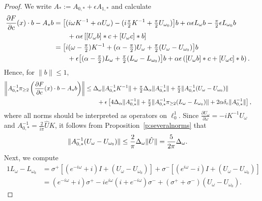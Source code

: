 \begin{proof}
We write $A_* := A_{0,*} + \epsilon A_{1,*}$ and calculate
\begin{alignat*}{1}
\frac{\partial F}{\partial c} (x) \cdot b - A_* b 
& = 
 \bigl[( i \omega K^{-1} + \alpha U_{\omega}) - ( i \tfrac{\pi}{2} K^{-1} + \tfrac{\pi}{2} U_{\omega_0}) \bigr] b  + \alpha \epsilon  L_\omega b  - \tfrac{\pi}{2} \epsilon L_{\omega_0} b 
 \\& \qquad
	+ \alpha \epsilon \left[ [ U_\omega b] * c + [U_{\omega} c ]*b \right]
 \\ & =
	\bigl[ i ( \omega - \tfrac{\pi}{2} ) K^{-1} + ( \alpha - \tfrac{\pi}{2}) U_{\omega} + \tfrac{\pi}{2} ( U_{\omega} - U_{\omega_0}) \bigr] b 
	\\ & \qquad 
	+ \epsilon \bigl[ ( \alpha - \tfrac{\pi}{2}) L_{\omega} + \tfrac{\pi}{2} ( L_{\omega} - L_{\omega_0}) \bigr] b 
+ \alpha \epsilon \left( [U_{\omega } b] * c + [ U_{\omega } c ]*b \right) . 
\end{alignat*}
Hence, for $\|b\| \leq 1$, 
\begin{alignat}{1}
	\left\| A_{0,*}^{-1} \pi_{\geq 2} \left(   \frac{\partial F}{\partial c} (x) \cdot b -  A_* b  \right)  \right\|
	 &\leq 
	 \Delta_\omega  \| A_{0,*}^{-1} K^{-1} \| + \tfrac{\pi}{2} \Delta_\alpha \| A_{0,*}^{-1}  \| + \tfrac{\pi}{2} \| A_{0,*}^{-1}  ( U_{\omega} - U_{\omega_0}) \| \nonumber  \\
	& \qquad
	 + \epsilon  \left[ 4  \Delta_\alpha \|  A_{0,*}^{-1}   \| + \tfrac{\pi}{2} \| A_{0,*}^{-1} \pi_{\geq 2} ( L_{\omega} - L_{\omega_0}) \| 
	+  2 \alpha \delta_c \| A_{0,*}^{-1}  \|  \right]  \label{e:intermediate},
\end{alignat}	
where all norms should be interpreted as operators on $\ell^1_0$.
	Since
$\frac{\partial U_\omega}{\partial  \omega} = - i K^{-1} U_{\omega}$
and $ A_{0,*}^{-1} = \frac{2}{i\pi} \hat{U} K$, it follows from Proposition~\ref{p:severalnorms} that  
\begin{equation}\label{e:AUoUo0}
	\| A_{0,*}^{-1}  (U_{\omega} - U_{\omega_0})  \| \leq  \frac{2}{\pi}  \Delta_\omega \| \hat{U} \| 
	= \frac{5}{2 \pi } \Delta_\omega .
\end{equation}
Next, we compute
	\begin{alignat*}{1}
	L_{\omega} - L_{\omega_0}  &= \sigma^+ \left[ (e^{-i \omega} + i) I + (U_{\omega} - U_{\omega_0})\right] + \sigma^- \left[ (e^{i \omega} - i) I + (U_{\omega} - U_{\omega_0}) \right] \\
	&=  (e^{-i \omega} + i)  \sigma^+ - i e^{i\omega} (i+e^{-i \omega})\sigma^- 
	+ (\sigma^+ + \sigma^-) (U_{\omega} - U_{\omega_0}) .

\end{alignat*}
\end{proof}

